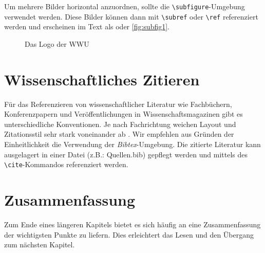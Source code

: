 Um mehrere Bilder horizontal anzuordnen, sollte die \verb+\subfigure+-Umgebung verwendet werden. Diese Bilder können dann mit \verb+\subref+ oder \verb+\ref+ referenziert werden und erscheinen im Text als  oder \ref{fig:subfig1}.

\begin{figure}
\begin{center}
\end{center}
\caption{Das Logo der WWU}
\label{fig:histogram}
\end{figure}


\section{Wissenschaftliches Zitieren}
\label{s:zitat}
Für das Referenzieren von wissenschaftlicher Literatur wie Fachbüchern, Konferenzpapern und Veröffentlichungen in Wissenschaftsmagazinen gibt es unterschiedliche Konventionen. Je nach Fachrichtung weichen Layout und Zitationsstil sehr stark voneinander ab \cite{jele2010}. Wir empfehlen aus Gründen der Einheitlichkeit die Verwendung der \emph{Bibtex}-Umgebung. Die zitierte Literatur kann ausgelagert in einer Datei (z.B.: Quellen.bib) gepflegt werden und mittels des \verb+\cite+-Kommandos referenziert werden.


\section{Zusammenfassung}
\label{s:zusammenfassung}
Zum Ende eines längeren Kapitels bietet es sich häufig an eine Zusammenfassung der wichtigsten Punkte zu liefern. Dies erleichtert das Lesen und den Übergang zum nächsten Kapitel.
